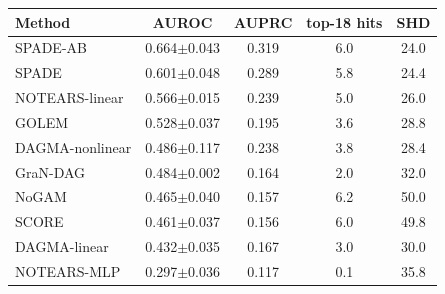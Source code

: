 \begin{tabular}{lcccc}
\toprule
Method & AUROC & AUPRC & top-18 hits & SHD \\ \midrule
SPADE-AB & 0.664$\pm$0.043 & 0.319 & 6.0 & 24.0 \\
SPADE & 0.601$\pm$0.048 & 0.289 & 5.8 & 24.4 \\
NOTEARS-linear & 0.566$\pm$0.015 & 0.239 & 5.0 & 26.0 \\
GOLEM & 0.528$\pm$0.037 & 0.195 & 3.6 & 28.8 \\
DAGMA-nonlinear & 0.486$\pm$0.117 & 0.238 & 3.8 & 28.4 \\
GraN-DAG & 0.484$\pm$0.002 & 0.164 & 2.0 & 32.0 \\
NoGAM & 0.465$\pm$0.040 & 0.157 & 6.2 & 50.0 \\
SCORE & 0.461$\pm$0.037 & 0.156 & 6.0 & 49.8 \\
DAGMA-linear & 0.432$\pm$0.035 & 0.167 & 3.0 & 30.0 \\
NOTEARS-MLP & 0.297$\pm$0.036 & 0.117 & 0.1 & 35.8 \\
\bottomrule
\end{tabular}
